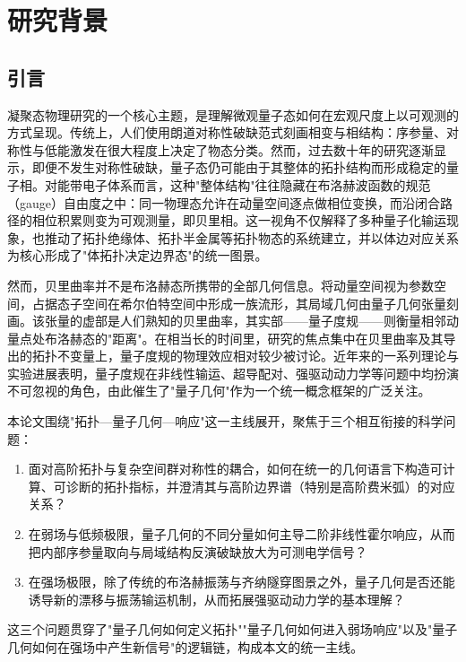
\chapter{研究背景}

\section{引言}
\label{sec:introduction}

凝聚态物理研究的一个核心主题，是理解微观量子态如何在宏观尺度上以可观测的方式呈现。传统上，人们使用朗道对称性破缺范式刻画相变与相结构：序参量、对称性与低能激发在很大程度上决定了物态分类。然而，过去数十年的研究逐渐显示，即便不发生对称性破缺，量子态仍可能由于其整体的拓扑结构而形成稳定的量子相。对能带电子体系而言，这种"整体结构"往往隐藏在布洛赫波函数的规范（gauge）自由度之中：同一物理态允许在动量空间逐点做相位变换，而沿闭合路径的相位积累则变为可观测量，即贝里相\cite{Berry}。这一视角不仅解释了多种量子化输运现象，也推动了拓扑绝缘体、拓扑半金属等拓扑物态的系统建立，并以体边对应关系为核心形成了"体拓扑决定边界态"的统一图景\cite{RevModPhys.82.3045,RevModPhys.83.1057}。

然而，贝里曲率并不是布洛赫态所携带的全部几何信息。将动量空间视为参数空间，占据态子空间在希尔伯特空间中形成一族流形，其局域几何由量子几何张量刻画\cite{Provost1980}。该张量的虚部是人们熟知的贝里曲率，其实部——量子度规——则衡量相邻动量点处布洛赫态的"距离"。在相当长的时间里，研究的焦点集中在贝里曲率及其导出的拓扑不变量上，量子度规的物理效应相对较少被讨论。近年来的一系列理论与实验进展表明，量子度规在非线性输运、超导配对、强驱动动力学等问题中均扮演不可忽视的角色，由此催生了"量子几何"作为一个统一概念框架的广泛关注\cite{annurev-conmatphys-060220-100347}。

本论文围绕"拓扑—量子几何—响应"这一主线展开，聚焦于三个相互衔接的科学问题：
\begin{enumerate}
  \item 面对高阶拓扑与复杂空间群对称性的耦合，如何在统一的几何语言下构造可计算、可诊断的拓扑指标，并澄清其与高阶边界谱（特别是高阶费米弧）的对应关系？
  \item 在弱场与低频极限，量子几何的不同分量如何主导二阶非线性霍尔响应，从而把内部序参量取向与局域结构反演破缺放大为可测电学信号？
  \item 在强场极限，除了传统的布洛赫振荡与齐纳隧穿图景之外，量子几何是否还能诱导新的漂移与振荡输运机制，从而拓展强驱动动力学的基本理解？
\end{enumerate}
这三个问题贯穿了"量子几何如何定义拓扑""量子几何如何进入弱场响应"以及"量子几何如何在强场中产生新信号"的逻辑链，构成本文的统一主线。

